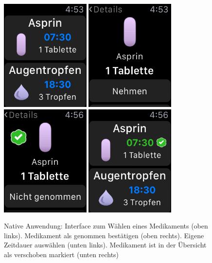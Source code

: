 \begin{figure}
	\caption{Native Anwendung: Interface zum Wählen eines Medikaments (oben links). Medikament als genommen bestätigen (oben rechts). Eigene Zeitdauer auswählen (unten links). Medikament ist in der Übersicht als verschoben markiert (unten rechts)}
	\label{fig:watch-app-take}
	\centering
	\includegraphics[width=0.4\textwidth]{04_realisation/screenshots/watch/notTaken01.png}
	\includegraphics[width=0.4\textwidth]{04_realisation/screenshots/watch/notTaken02.png}
	\includegraphics[width=0.4\textwidth]{04_realisation/screenshots/watch/taken01.png}
	\includegraphics[width=0.4\textwidth]{04_realisation/screenshots/watch/taken02.png}
\end{figure}

